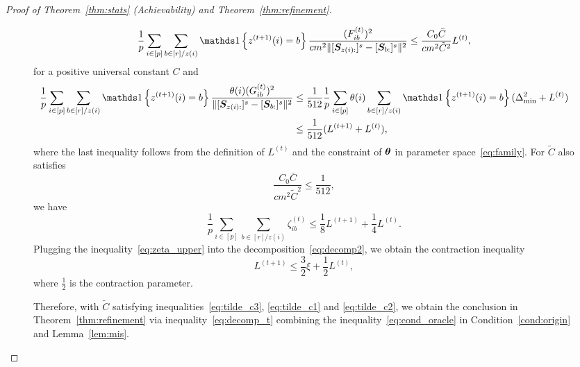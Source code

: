 \documentclass[journal]{IEEEtran}
\theoremstyle{definition}
\theoremstyle{definition}
\newcommand{\offf}[1]{\left\{#1\right\}}
\def\fixme#1#2{\textbf{\color{red}[FIXME (#1): #2]}}
\begin{document}
\begin{proof}[Proof of Theorem~\ref{thm:stats} (Achievability) and Theorem~\ref{thm:refinement}]
\begin{figure}[t]
\setcounter{equation}{74} 
\begin{equation}\label{eq:f_sum}
          \frac{1}{p} \sum_{i \in [p]}\sum_{b \in [r]/z(i)} \ind \offf{ z^{(t+1)}(i) = b} \frac{(F_{ib}^{(t)})^2}{ cm^2 \onormSize{}{ [ \mS_{z(i):}  ]^s - [ \mS_{b:}  ]^s  }^2} \leq \frac{C_0 \bar C}{c m^2 \tilde C^2} L^{(t)},
    \end{equation}
    for a positive universal constant $C$ and 
    \begin{align}
         \frac{1}{p} \sum_{i \in [p]}\sum_{b \in [r]/z(i)} \ind \offf{ z^{(t+1)}(i) = b} \frac{\theta(i)(G_{ib}^{(t)})^2}{ \onormSize{}{ [ \mS_{z(i):}  ]^s - [ \mS_{b:}  ]^s  }^2}  &\leq \frac{1}{512} \frac{1}{p} \sum_{i \in [p]}\theta(i) \sum_{b \in [r]/z(i)}   \ind \offf{ z^{(t+1)}(i) = b}  (\Delta_{\min}^2 + L^{(t)}) \\
         & \leq \frac{1}{512} (L^{(t+1)} + L^{(t)}), \label{eq:g_sum}
    \end{align}
 where the last inequality follows from the definition of $L^{(t)}$ and the constraint of $\boldsymbol{\theta}$ in parameter space~\eqref{eq:family}. For $\tilde C$ also satisfies 
    \begin{equation}\label{eq:tilde_c3}
         \frac{C_0 \bar C}{c m^2 \tilde C^2} \leq \frac{1}{512},
    \end{equation}
    we have 
    \begin{equation}\label{eq:zeta_upper}
        \frac{1}{p}\sum_{i \in [p] }  \sum_{b \in [r]/z(i)}  \zeta_{ib}^{(t)} \leq  \frac{1}{8} L^{(t+1)}  + \frac{1}{4} L^{(t)}.
    \end{equation}
    Plugging the inequality~\eqref{eq:zeta_upper} into the decomposition~\eqref{eq:decomp2}, we obtain the contraction inequality 
    \begin{equation}\label{eq:decomp_t}
          L^{(t+1)} \leq \frac{3}{2} \xi  + \frac{1}{2} L^{(t)},
    \end{equation}
     where $\frac{1}{2}$ is the contraction parameter. 
     
     Therefore, with $\tilde C$ satisfying inequalities~\eqref{eq:tilde_c3}, \eqref{eq:tilde_c1} and \eqref{eq:tilde_c2}, we obtain the conclusion in Theorem~\ref{thm:refinement} via inequality~\eqref{eq:decomp_t} combining the inequality~\eqref{eq:cond_oracle} in Condition~\ref{cond:origin} and Lemma~\ref{lem:mis}. 
     

\end{figure}
\end{proof}
\end{document}
